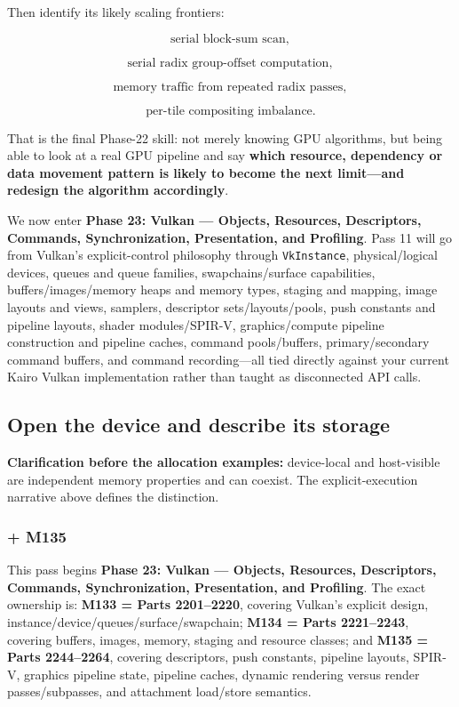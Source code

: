 Then identify its likely scaling frontiers:

\[
\text{serial block-sum scan},
\]

\[
\text{serial radix group-offset computation},
\]

\[
\text{memory traffic from repeated radix passes},
\]

\[
\text{per-tile compositing imbalance}.
\]

That is the final Phase-22 skill: not merely knowing GPU algorithms, but being able to look at a real GPU pipeline and say \textbf{which resource, dependency or data movement pattern is likely to become the next limit---and redesign the algorithm accordingly}.

We now enter \textbf{Phase 23: Vulkan --- Objects, Resources, Descriptors, Commands, Synchronization, Presentation, and Profiling}. Pass 11 will go from Vulkan's explicit-control philosophy through \texttt{VkInstance}, physical/logical devices, queues and queue families, swapchains/surface capabilities, buffers/images/memory heaps and memory types, staging and mapping, image layouts and views, samplers, descriptor sets/layouts/pools, push constants and pipeline layouts, shader modules/SPIR-V, graphics/compute pipeline construction and pipeline caches, command pools/buffers, primary/secondary command buffers, and command recording---all tied directly against your current Kairo Vulkan implementation rather than taught as disconnected API calls.

\subsection{Open the device and describe its storage}\label{open-the-device-and-describe-its-storage}

\textbf{Clarification before the allocation examples:} device-local and host-visible are independent memory properties and can coexist. The explicit-execution narrative above defines the distinction.

\subsubsection{+ M135}\label{m135}

This pass begins \textbf{Phase 23: Vulkan --- Objects, Resources, Descriptors, Commands, Synchronization, Presentation, and Profiling}. The exact ownership is: \textbf{M133 = Parts 2201--2220}, covering Vulkan's explicit design, instance/device/queues/surface/swapchain; \textbf{M134 = Parts 2221--2243}, covering buffers, images, memory, staging and resource classes; and \textbf{M135 = Parts 2244--2264}, covering descriptors, push constants, pipeline layouts, SPIR-V, graphics pipeline state, pipeline caches, dynamic rendering versus render passes/subpasses, and attachment load/store semantics.

